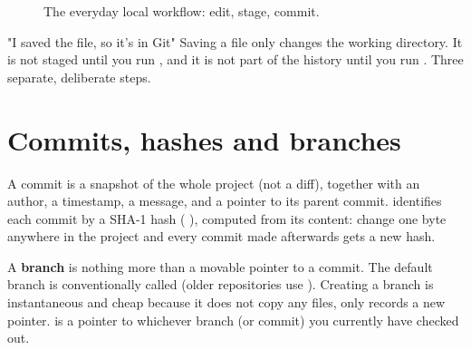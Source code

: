 \begin{figure}[H]
  \centering
  \caption{The everyday local workflow: edit, stage, commit.}
  \label{fig:basics:workflow}
\end{figure}

\begin{gotcha}{"I saved the file, so it's in Git"}
Saving a file only changes the working directory. It is not staged
until you run , and it is not part of the history until
you run . Three separate, deliberate steps.
\end{gotcha}

\section{Commits, hashes and branches}

A commit is a snapshot of the whole project (not a diff), together with
an author, a timestamp, a message, and a pointer to its parent commit.
\Git{} identifies each commit by a SHA-1 hash (\eg
{}), computed from its content: change one byte anywhere
in the project and every commit made afterwards gets a new hash.

A \textbf{branch} is nothing more than a movable pointer to a commit.
The default branch is conventionally called  (older
repositories use ). Creating a branch is instantaneous and
cheap because it does not copy any files, only records a new pointer.
 is a pointer to whichever branch (or commit) you currently
have checked out.

